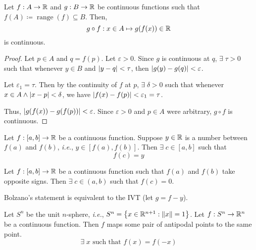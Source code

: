 
\begin{thm} \label{thm:cont:composition}
    Let $f: A \to \mathbb{R}$ and $g: B \to \mathbb{R}$ be continuous functions such that $f(A) \coloneqq \mathop{range}(f) \subseteq B$. Then, \[
        g \circ f : x \in A \mapsto g(f(x)) \in \mathbb{R}
    \] is continuous.
\end{thm}

\begin{proof}
    Let $p \in A$ and $q = f(p)$. Let $\varepsilon > 0$. Since $g$ is continuous at $q$, $\exists\; \tau > 0$ such that whenever $y \in B$ and $\abs{ y - q } < \tau$, then $\abs{ g(y) - g(q) } < \varepsilon$.

    Let $\varepsilon_{1} = \tau$. Then by the continuity of $f$ at $p$, $\exists\; \delta > 0$ such that whenever $x \in A \land \abs{ x - p } < \delta$, we have $\abs{ f(x) - f(p) } < \varepsilon_{1} = \tau$.

    Thus, $\abs{ g(f(x)) - g(f(p)) } < \varepsilon$. Since $\varepsilon > 0$ and $p \in A$ were arbitrary, $g \circ f$ is continuous.
\end{proof}

\begin{thm} \label{thm:cont:IVT}
    Let $f: [a, b] \to \mathbb{R}$ be a continuous function. Suppose $y \in \mathbb{R}$ is a number between $f(a)$ and $f(b)$, \textit{i.e.}, $y \in [f(a), f(b)]$. Then $\exists\; c \in [a, b]$ such that \[
        f(c) = y
    \]
\end{thm}
\begin{cor} \label{thm:cont:Bolzano}
    Let $f : [a, b] \to \mathbb{R}$ be a continuous function such that $f(a)$ and $f(b)$ take opposite signs. Then $\exists\; c \in (a, b)$ such that $f(c) = 0$.
\end{cor}
\begin{rem}
    Bolzano's statement is equivalent to the IVT (let $g = f - y$).
\end{rem}

\begin{thm} \label{thm:cont:Borsuk-Ulam}
    Let $S^{n}$ be the unit $n$-sphere, \textit{i.e.}, $S^{n} = \set{x \in \R^{n+1} : \norm{x} = 1}$. Let $f: S^{n} \to \mathbb{R}^{n}$ be a continuous function.
    Then $f$ maps some pair of antipodal points to the same point. \[
        \exists\; x \text{ such that } f(x) = f(-x)
    \]
\end{thm}

